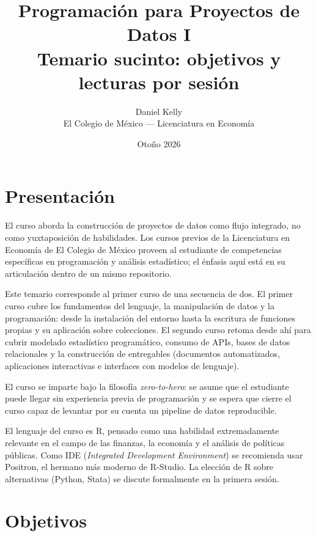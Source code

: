 \documentclass[11pt,letterpaper]{article}
\title{\color{main}\textbf{Programación para Proyectos de Datos I}\\[0.3em]
       \large\color{subtitle}Temario sucinto: objetivos y lecturas por sesión}
\author{Daniel Kelly\\
        \small El Colegio de México --- Licenciatura en Economía}
\date{Otoño 2026}
\newcommand{\blue}[1]{{\color{cerulean}#1}}
\newcommand{\orange}[1]{{\color{redorange}#1}}
\begin{document}
\maketitle

\section{Presentación}

El curso aborda la construcción de proyectos de datos como flujo integrado, no como yuxtaposición de habilidades. Los cursos previos de la Licenciatura en Economía de El Colegio de México proveen al estudiante de competencias específicas en programación y análisis estadístico; el énfasis aquí está en su articulación dentro de un mismo repositorio.

Este temario corresponde al \blue{primer curso} de una secuencia de dos. El primer curso cubre los fundamentos del lenguaje, la manipulación de datos y la programación: desde la instalación del entorno hasta la escritura de funciones propias y su aplicación sobre colecciones. El \orange{segundo curso} retoma desde ahí para cubrir modelado estadístico programático, consumo de APIs, bases de datos relacionales y la construcción de entregables (documentos automatizados, aplicaciones interactivas e interfaces con modelos de lenguaje).

El curso se imparte bajo la filosofía \textit{zero-to-hero}: se asume que el estudiante puede llegar sin experiencia previa de programación y se espera que cierre el curso capaz de levantar por su cuenta un pipeline de datos reproducible.

El lenguaje del curso es R, pensado como una habilidad extremadamente relevante en el campo de las finanzas, la economía y el análisis de políticas públicas. Como IDE (\textit{Integrated Development Environment}) se recomienda usar Positron, el hermano más moderno de R-Studio. La elección de R sobre alternativas (Python, Stata) se discute formalmente en la primera sesión.

\section{Objetivos}
\end{document}
